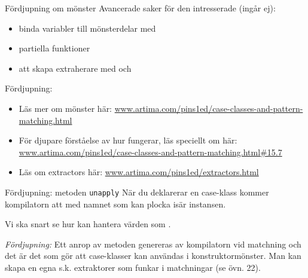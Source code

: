 \begin{Slide}{Fördjupning om mönster}
Avancerade saker för den intresserade (ingår ej): 
\begin{itemize}
\item binda variabler till mönsterdelar med 
\item partiella funktioner
\item att skapa extraherare med  och 
\end{itemize}
Fördjupning:
\begin{itemize}
\item Läs mer om mönster här:  \href{http://www.artima.com/pins1ed/case-classes-and-pattern-matching.html}{\SlideFontTiny www.artima.com/pins1ed/case-classes-and-pattern-matching.html}

\item För djupare förståelse av hur  fungerar, läs speciellt om  här: \href{http://www.artima.com/pins1ed/case-classes-and-pattern-matching.html\#15.7}{\SlideFontTiny www.artima.com/pins1ed/case-classes-and-pattern-matching.html\#15.7}

\item Läs om extractors här: \href{http://www.artima.com/pins1ed/extractors.html}{\SlideFontTiny www.artima.com/pins1ed/extractors.html}

\end{itemize} 
\end{Slide}


\begin{Slide}{Fördjupning: metoden \texttt{unapply}}\SlideFontSmall
När du deklarerar en case-klass kommer kompilatorn att  med namnet  som kan plocka isär instansen.
Vi ska snart se hur  kan hantera värden som  . \\
\pause

{\SlideFontTiny\vspace{1em}\emph{Fördjupning:} Ett anrop av metoden  genereras av kompilatorn vid matchning och det är det som gör att case-klasser kan användas i konstruktormönster. Man kan skapa en egna s.k. extraktorer  som funkar i matchningar (se övn. 22).}
\end{Slide}






